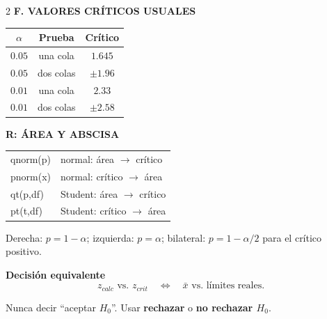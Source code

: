 \documentclass[11pt,a4paper]{article}
\begin{document}
\begin{multicols}{2}
\textbf{F. VALORES CRÍTICOS USUALES}
\begin{center}
\begin{tabular}{ccc}
\toprule
$\alpha$ & Prueba & Crítico\\\midrule
$0.05$ & una cola & $1.645$\\
$0.05$ & dos colas & $\pm1.96$\\
$0.01$ & una cola & $2.33$\\
$0.01$ & dos colas & $\pm2.58$\\
\bottomrule
\end{tabular}
\end{center}

\textbf{R: ÁREA Y ABSCISA}
\begin{center}
\scriptsize
\begin{tabularx}{\linewidth}{>{\ttfamily}lX}
qnorm(p) & normal: área $\to$ crítico\\
pnorm(x) & normal: crítico $\to$ área\\
qt(p,df) & Student: área $\to$ crítico\\
pt(t,df) & Student: crítico $\to$ área\\
\end{tabularx}
\end{center}
Derecha: $p=1-\alpha$; izquierda: $p=\alpha$; bilateral: $p=1-\alpha/2$ para el crítico positivo.

\textbf{Decisión equivalente}
\[
z_{calc}\text{ vs. }z_{crit}
\quad\Longleftrightarrow\quad
\bar{x}\text{ vs. límites reales}.
\]

\begin{regla}
Nunca decir ``aceptar $H_0$''. Usar \textbf{rechazar} o \textbf{no rechazar $H_0$}.
\end{regla}
\end{multicols}
\end{document}
